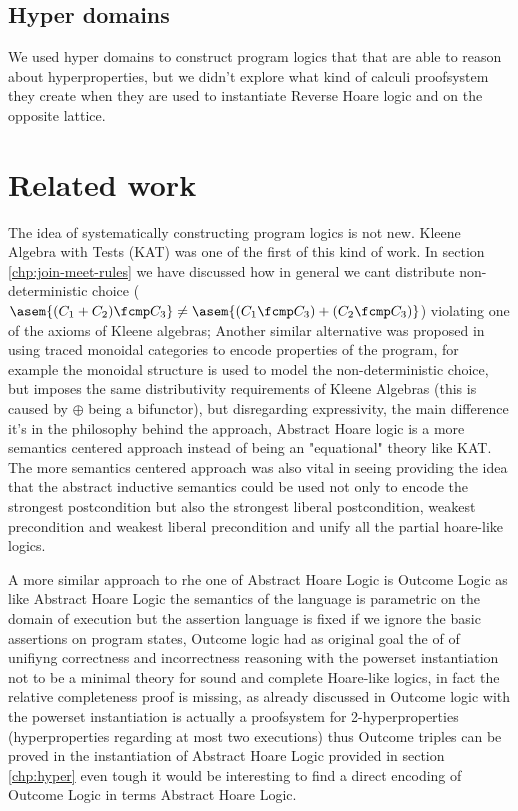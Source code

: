 \subsection{Hyper domains}
We used hyper domains to construct program logics that that are able to reason
about hyperproperties, but we didn't explore what kind of calculi proofsystem 
they create when they are used to instantiate Reverse Hoare logic and on the 
opposite lattice.

\section{Related work}

The idea of systematically constructing program logics is not new. Kleene
Algebra with Tests (KAT) \cite{Kozen97} was one of the first of this kind of work.
In section \ref{chp:join-meet-rules} we have discussed how in general we
cant distribute non-deterministic choice ($\asem{(C_1 + C_2) \fcmp C_3} \neq
\asem{(C_1 \fcmp C_3) + (C_2 \fcmp C_3)}$) violating one of the axioms of
Kleene algebras; Another similar alternative was proposed in \cite{Martin06}
using traced monoidal categories to encode properties of the program, for
example the monoidal structure is used to model the non-deterministic choice,
but imposes the same distributivity requirements of Kleene Algebras (this is
caused by $\oplus$ being a bifunctor), but disregarding expressivity, the
main difference it's in the philosophy behind the approach, Abstract Hoare logic
is a more semantics centered approach instead of being an "equational" theory
like KAT. The more semantics centered approach was also vital in seeing
providing the idea that the abstract inductive semantics could be used not only
to encode the strongest postcondition but also the strongest liberal postcondition,
weakest precondition and weakest liberal precondition and unify all the
partial hoare-like logics.

A more similar approach to rhe one of Abstract Hoare Logic is Outcome Logic
\cite{Zilberstein23} as like Abstract Hoare Logic the semantics of the language
is parametric on the domain of execution but the assertion language is fixed
if we ignore the basic assertions on program states, Outcome logic had as original
goal the of of unifiyng correctness and incorrectness reasoning with the powerset
instantiation not to be a minimal theory for sound and complete Hoare-like
logics, in fact the relative completeness proof is missing, as already discussed
in \cite{Darnier2023} Outcome logic with the powerset instantiation is actually
a proofsystem for 2-hyperproperties (hyperproperties regarding at most two
executions) thus Outcome triples can be proved in the instantiation of
Abstract Hoare Logic provided in section \ref{chp:hyper} even tough it would
be interesting to find a direct encoding of Outcome Logic in terms Abstract
Hoare Logic.
